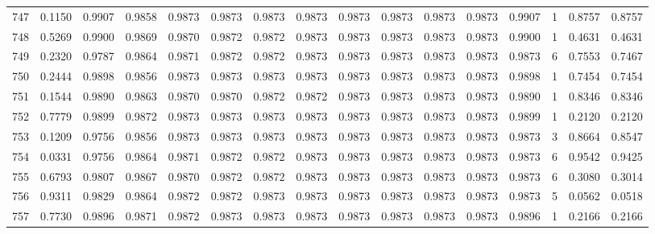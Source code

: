 \begin{tabular}{lrrrrrrrrrrrrrrr}
747 &      0.1150 &  0.9907 &  0.9858 &  0.9873 &  0.9873 &  0.9873 &  0.9873 &  0.9873 &  0.9873 &  0.9873 &   0.9873 &     0.9907 &      1 &                    0.8757 &                     0.8757 \\
748 &      0.5269 &  0.9900 &  0.9869 &  0.9870 &  0.9872 &  0.9872 &  0.9873 &  0.9873 &  0.9873 &  0.9873 &   0.9873 &     0.9900 &      1 &                    0.4631 &                     0.4631 \\
749 &      0.2320 &  0.9787 &  0.9864 &  0.9871 &  0.9872 &  0.9872 &  0.9873 &  0.9873 &  0.9873 &  0.9873 &   0.9873 &     0.9873 &      6 &                    0.7553 &                     0.7467 \\
750 &      0.2444 &  0.9898 &  0.9856 &  0.9873 &  0.9873 &  0.9873 &  0.9873 &  0.9873 &  0.9873 &  0.9873 &   0.9873 &     0.9898 &      1 &                    0.7454 &                     0.7454 \\
751 &      0.1544 &  0.9890 &  0.9863 &  0.9870 &  0.9870 &  0.9872 &  0.9872 &  0.9873 &  0.9873 &  0.9873 &   0.9873 &     0.9890 &      1 &                    0.8346 &                     0.8346 \\
752 &      0.7779 &  0.9899 &  0.9872 &  0.9873 &  0.9873 &  0.9873 &  0.9873 &  0.9873 &  0.9873 &  0.9873 &   0.9873 &     0.9899 &      1 &                    0.2120 &                     0.2120 \\
753 &      0.1209 &  0.9756 &  0.9856 &  0.9873 &  0.9873 &  0.9873 &  0.9873 &  0.9873 &  0.9873 &  0.9873 &   0.9873 &     0.9873 &      3 &                    0.8664 &                     0.8547 \\
754 &      0.0331 &  0.9756 &  0.9864 &  0.9871 &  0.9872 &  0.9872 &  0.9873 &  0.9873 &  0.9873 &  0.9873 &   0.9873 &     0.9873 &      6 &                    0.9542 &                     0.9425 \\
755 &      0.6793 &  0.9807 &  0.9867 &  0.9870 &  0.9872 &  0.9872 &  0.9873 &  0.9873 &  0.9873 &  0.9873 &   0.9873 &     0.9873 &      6 &                    0.3080 &                     0.3014 \\
756 &      0.9311 &  0.9829 &  0.9864 &  0.9872 &  0.9872 &  0.9873 &  0.9873 &  0.9873 &  0.9873 &  0.9873 &   0.9873 &     0.9873 &      5 &                    0.0562 &                     0.0518 \\
757 &      0.7730 &  0.9896 &  0.9871 &  0.9872 &  0.9873 &  0.9873 &  0.9873 &  0.9873 &  0.9873 &  0.9873 &   0.9873 &     0.9896 &      1 &                    0.2166 &                     0.2166 \\

\end{tabular}
